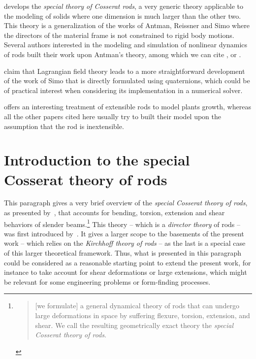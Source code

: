  develops the \emph{special theory of Cosserat rods}, a very generic theory applicable to the modeling of solids where one dimension is much larger than the other two. This theory is a generalization of the works of Antman, Reissner and Simo where the directors of the material frame is not constrained to rigid body motions. Several authors interested in the modeling and simulation of nonlinear dynamics of rods built their work upon Antman's theory, among which we can cite ,  or .

 claim that Lagrangian field theory leads to a more straightforward development of the work of Simo \cite{Simo1991} that is directly formulated using quaternions, which could be of practical interest when considering its implementation in a numerical solver.

 offers an interesting treatment of extensible rods to model plants growth, whereas all the other papers cited here usually try to built their model upon the assumption that the rod is inextensible.


%
%

\clearpage
\section{Introduction to the special Cosserat theory of rods}\label{sec:cosserat_theory}

This paragraph gives a very brief overview of the \emph{special Cosserat theory of rods}, as presented by~, that accounts for bending, torsion, extension and shear  behaviors of slender beams.\footnote{\blockcquote[p.~270]{Antman2005}{[we formulate] a general dynamical theory of rods that can undergo large deformations in space by suffering flexure, torsion, extension, and shear. We call the resulting geometrically exact theory the \emph{special Cosserat theory of rods}.}} This theory -- which is a \emph{director theory} of rods -- was first introduced by~\cite{Antman1974}. It gives a larger scope to the basements of the present work -- which relies on the \emph{Kirchhoff theory of rods} -- as the last is a special case of this larger theoretical framework. Thus, what is presented in this paragraph could be considered as a reasonable starting point to extend the present work, for instance to take account for shear deformations or large extensions, which might be relevant for some engineering problems or form-finding processes.

